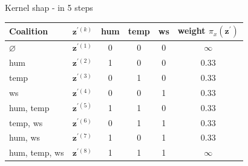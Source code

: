 \documentclass[10pt,compress,t,notes=noshow, xcolor=table]{beamer}
\begin{document}
\begin{frame}{Kernel shap - in 5 steps}
\begin{table}[]
    \centering
        \begin{tabular}{l |c|ccc|c}
 Coalition & $\mathbf{z}^{\prime (k)}$ &  hum & temp & ws & weight $\pi_{x}\left(\mathbf{z}^{\prime}\right)$\\
  \hline 
  $\varnothing$ & $\mathbf{z}^{\prime (1)}$ & 0 & 0 & 0 & $\infty$ \\
  hum & $\mathbf{z}^{\prime (2)}$ & 1 & 0 & 0 & 0.33 \\
  temp &  $\mathbf{z}^{\prime (3)}$ & 0 & 1 & 0 & 0.33 \\
  ws &   $\mathbf{z}^{\prime (4)}$ & 0 & 0 & 1 & 0.33  \\
  hum, temp & $\mathbf{z}^{\prime (5)}$ & 1 & 1 & 0 & 0.33 \\
  temp, ws & $\mathbf{z}^{\prime (6)}$ & 0 & 1 & 1 & 0.33 \\
  hum, ws &   $\mathbf{z}^{\prime (7)}$ & 1 & 0 & 1 & 0.33 \\
  hum, temp, ws & $\mathbf{z}^{\prime (8)}$ & 1 & 1 & 1 & $\infty$ \\
  
 
  \end{tabular}
\end{table}

  
\end{frame}





\end{document}
